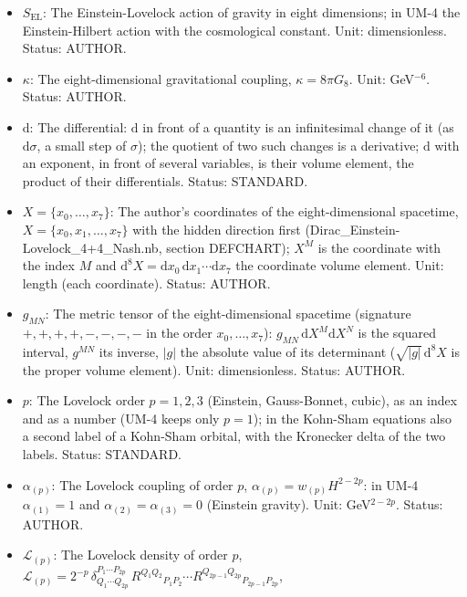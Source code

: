 \documentclass[
  10pt,
]{article}
\providecommand{\tightlist}{%
  \setlength{\itemsep}{0pt}\setlength{\parskip}{0pt}}
\begin{document}
\begin{itemize}
\tightlist
\item
  \(S_{\mathrm{EL}}\): The Einstein-Lovelock action of gravity in eight
  dimensions; in UM-4 the Einstein-Hilbert action with the cosmological
  constant. Unit: dimensionless. Status: AUTHOR.
\item
  \(\kappa\): The eight-dimensional gravitational coupling,
  \(\kappa = 8\pi G_8\). Unit: GeV\(^{-6}\). Status: AUTHOR.
\item
  \(\mathrm{d}\): The differential: \(\mathrm{d}\) in front of a
  quantity is an infinitesimal change of it (as \(\mathrm{d}\sigma\), a
  small step of \(\sigma\)); the quotient of two such changes is a
  derivative; \(\mathrm{d}\) with an exponent, in front of several
  variables, is their volume element, the product of their
  differentials. Status: STANDARD.
\item
  \(X = \{x_0, \dots, x_7\}\): The author's coordinates of the
  eight-dimensional spacetime, \(X = \{x_0, x_1, \dots, x_7\}\) with the
  hidden direction first (Dirac\_Einstein-Lovelock\_4+4\_Nash.nb,
  section DEFCHART); \(X^M\) is the coordinate with the index \(M\) and
  \(\mathrm{d}^8X = \mathrm{d}x_0\,\mathrm{d}x_1\cdots\mathrm{d}x_7\)
  the coordinate volume element. Unit: length (each coordinate). Status:
  AUTHOR.
\item
  \(g_{MN}\): The metric tensor of the eight-dimensional spacetime
  (signature \(+,+,+,+,-,-,-,-\) in the order \(x_0, \dots, x_7\)):
  \(g_{MN}\,\mathrm{d}X^M\mathrm{d}X^N\) is the squared interval,
  \(g^{MN}\) its inverse, \(\lvert g\rvert\) the absolute value of its
  determinant (\(\sqrt{\lvert g\rvert}\,\mathrm{d}^8X\) is the proper
  volume element). Unit: dimensionless. Status: AUTHOR.
\item
  \(p\): The Lovelock order \(p = 1, 2, 3\) (Einstein, Gauss-Bonnet,
  cubic), as an index and as a number (UM-4 keeps only \(p = 1\)); in
  the Kohn-Sham equations also a second label of a Kohn-Sham orbital,
  with the Kronecker delta of the two labels. Status: STANDARD.
\item
  \(\alpha_{(p)}\): The Lovelock coupling of order \(p\),
  \(\alpha_{(p)} = w_{(p)}H^{2-2p}\): in UM-4 \(\alpha_{(1)} = 1\) and
  \(\alpha_{(2)} = \alpha_{(3)} = 0\) (Einstein gravity). Unit:
  GeV\(^{2-2p}\). Status: AUTHOR.
\item
  \(\mathcal{L}_{(p)}\): The Lovelock density of order \(p\),
  \(\mathcal{L}_{(p)} = 2^{-p}\,\delta^{P_1\cdots P_{2p}}_{Q_1\cdots Q_{2p}}\,R^{Q_1Q_2}{}_{P_1P_2}\cdots R^{Q_{2p-1}Q_{2p}}{}_{P_{2p-1}P_{2p}}\),

\end{itemize}
\end{document}
